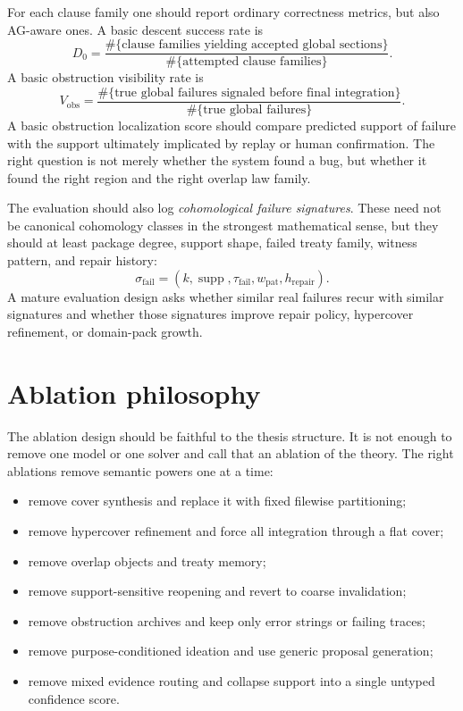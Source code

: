 \documentclass[11pt]{report}
\begin{document}
For each clause family one should report ordinary correctness metrics, but also AG-aware ones. A basic descent success rate is
\[
D_0
=
\frac{\#\{\text{clause families yielding accepted global sections}\}}
{\#\{\text{attempted clause families}\}}.
\]
A basic obstruction visibility rate is
\[
V_{\mathrm{obs}}
=
\frac{\#\{\text{true global failures signaled before final integration}\}}
{\#\{\text{true global failures}\}}.
\]
A basic obstruction localization score should compare predicted support of failure with the support ultimately implicated by replay or human confirmation. The right question is not merely whether the system found a bug, but whether it found the right region and the right overlap law family.

The evaluation should also log \emph{cohomological failure signatures}. These need not be canonical cohomology classes in the strongest mathematical sense, but they should at least package degree, support shape, failed treaty family, witness pattern, and repair history:
\[
\sigma_{\mathrm{fail}}
=
(k,\operatorname{supp},\tau_{\mathrm{fail}},w_{\mathrm{pat}},h_{\mathrm{repair}}).
\]
A mature evaluation design asks whether similar real failures recur with similar signatures and whether those signatures improve repair policy, hypercover refinement, or domain-pack growth.

\section{Ablation philosophy}
The ablation design should be faithful to the thesis structure. It is not enough to remove one model or one solver and call that an ablation of the theory. The right ablations remove semantic powers one at a time:
\begin{itemize}
\item remove cover synthesis and replace it with fixed filewise partitioning;
\item remove hypercover refinement and force all integration through a flat cover;
\item remove overlap objects and treaty memory;
\item remove support-sensitive reopening and revert to coarse invalidation;
\item remove obstruction archives and keep only error strings or failing traces;
\item remove purpose-conditioned ideation and use generic proposal generation;
\item remove mixed evidence routing and collapse support into a single untyped confidence score.
\end{itemize}
\end{document}
